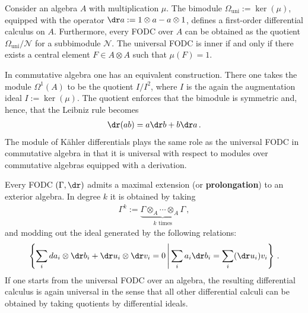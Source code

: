     \begin{example}
        Consider an algebra $A$ with multiplication $\mu$. The bimodule $\Omega_\text{uni}:=\ker(\mu)$, equipped with the operator $\dr a:=1\otimes a-a\otimes1$, defines a first-order differential calculus on $A$. Furthermore, every FODC over $A$ can be obtained as the quotient $\Omega_\text{uni}/\mathcal{N}$ for a subbimodule $\mathcal{N}$. The universal FODC is inner if and only if there exists a central element $F\in A\otimes A$ such that $\mu(F)=1$.
    \end{example}
    \begin{example}
        In commutative algebra one has an equivalent construction. There one takes the module $\Omega^1(A)$ to be the quotient $I/I^2$, where $I$ is the again the augmentation ideal $I:=\ker(\mu)$. The quotient enforces that the bimodule is symmetric and, hence, that the Leibniz rule becomes
        \begin{gather}
            \dr(ab) = a\dr b + b\dr a\,.
        \end{gather}
        The module of K\"ahler differentials plays the same role as the universal FODC in commutative algebra in that it is universal with respect to modules over commutative algebras equipped with a derivation.
    \end{example}


    \begin{property}[Prolongation]\label{qa:prolongation}
        Every FODC $(\Gamma,\dr)$ admits a maximal extension (or \textbf{prolongation}) to an exterior algebra. In degree $k$ it is obtained by taking
        \begin{gather}
            \Gamma^k := \underbrace{\Gamma\otimes_A\cdots\otimes_A\Gamma}_{k\text{ times}}\,,
        \end{gather}
        and modding out the ideal generated by the following relations:
        \begin{gather}
            \left\{\sum_ida_i\otimes\dr b_i+\dr u_i\otimes\dr v_i=0\,\middle\vert\,\sum_ia_i\dr b_i=\sum_i(\dr u_i)v_i\right\}\,.
        \end{gather}
        If one starts from the universal FODC over an algebra, the resulting differential calculus is again universal in the sense that all other differential calculi can be obtained by taking quotients by differential ideals.
    \end{property}


